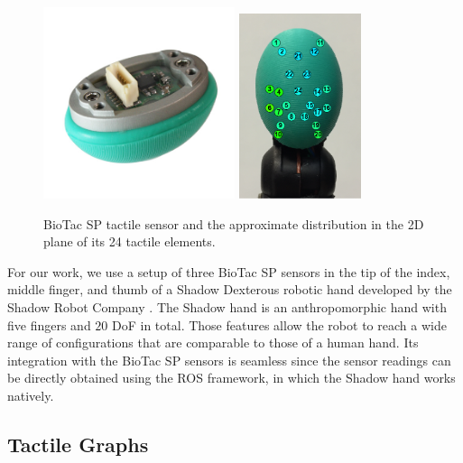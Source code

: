 \begin{figure}[!htb]
    \centering
    \includegraphics[width = 0.5\textwidth, clip = true, trim = 0 75 0 75]{Figures/Tactile/biotacsp}
    \includegraphics[width = 0.32\textwidth, clip = true, trim = 0 75 0 20]{Figures/Tactile/biotac-sensor.png}
	\caption{BioTac SP tactile sensor and the approximate distribution in the 2D plane of its 24 tactile elements.}
	\label{fig:biotac-sensor}
\end{figure}

For our work, we use a setup of three BioTac SP sensors in the tip of the index, middle finger, and thumb of a Shadow Dexterous robotic hand developed by the Shadow Robot Company \cite{ShadowRobotCompany2018}. The Shadow hand is an anthropomorphic hand with five fingers and $20$ \ac{DoF} in total. Those features allow the robot to reach a wide range of configurations that are comparable to those of a human hand. Its integration with the BioTac SP sensors is seamless since the sensor readings can be directly obtained using the \ac{ROS} \cite{Quigley2009} framework, in which the Shadow hand works natively.

\subsection{Tactile Graphs}
\label{cha:tactile:sec:tactilegcn:subsec:tactile-graphs}

